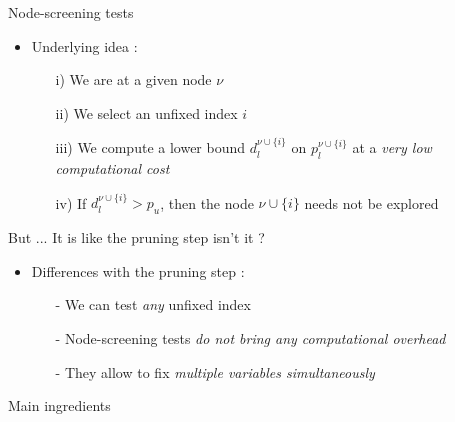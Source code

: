 \documentclass[final]{beamer}
\newlength{\onecolwid}
\newlength{\twocolwid}
\newcommand{\emphone}[1]{\textit{\color{norange}#1}}
\begin{document}
\begin{frame}[t]
\begin{columns}[t]
\begin{column}{\twocolwid}
\begin{columns}[t,totalwidth=\twocolwid]
        \begin{column}{\onecolwid}\vspace{-.6in}
            \begin{block}{Node-screening tests}
                \begin{itemize}
                    \item \hspace*{0.1em} Underlying idea :
                    \begin{itemize}
                        \normalsize \item[i)] \hspace*{0.1em} We are at a given node $\nu$
                        \item[ii)] \hspace*{0.1em} We select an unfixed index $i$
                        \item[iii)] \hspace*{0.1em} We compute a lower bound $d_l^{\nu \cup \{i\}}$ on $p_l^{\nu \cup \{i\}}$ at a \emphone{very low computational cost}
                        \item[iv)] \hspace*{0.1em} If $d_l^{\nu \cup \{i\}} > p_u$, then the node $\nu \cup \{i\}$ needs not be explored 
                    \end{itemize}
                \end{itemize}
                But ... It is like the pruning step isn't it ?
                \begin{itemize}
                    \item \hspace*{0.1em} Differences with the pruning step :
                    \begin{itemize}
                        \normalsize \item[-] \hspace*{0.1em} We can test \emphone{any} unfixed index
                        \item[-] \hspace*{0.1em} Node-screening tests \emphone{do not bring any computational overhead}
                        \item[-] \hspace*{0.1em} They allow to fix \emphone{multiple variables simultaneously}
                    \end{itemize}
                \end{itemize}
            \end{block}
            \begin{alertblock}{Main ingredients}

\end{alertblock}
\end{column}
\end{columns}
\end{column}
\end{columns}
\end{frame}
\end{document}
